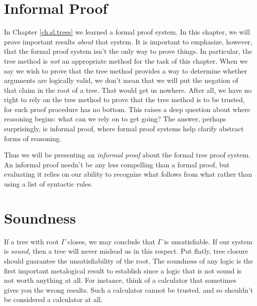 \section{Informal Proof}

In Chapter \ref{ch.sl.trees} we learned a formal proof system.
In this chapter, we will prove important results \emph{about} that system.
It is important to emphasize, however, that the formal proof system isn't the only way to prove things.
In particular, the tree method is \emph{not} an appropriate method for the task of this chapter.
When we say we wish to prove that the tree method provides a way to determine whether arguments are logically valid, we don't mean that we will put the negation of that claim in the root of a tree.
That would get us nowhere.
After all, we have no right to rely on the tree method to prove that the tree method is to be trusted, for such proof procedure has no bottom.
This raises a deep question about where reasoning begins: what can we rely on to get going?
The answer, perhaps surprisingly, is informal proof, where formal proof systems help clarify abstract forms of reasoning.

Thus we will be presenting an \emph{informal proof} about the formal tree proof system.
An informal proof needn't be any less compelling than a formal proof, but evaluating it relies on our ability to recognize what follows from what rather than using a list of syntactic rules.





\section{Soundness}

If a tree with root $\Gamma$ closes, we may conclude that $\Gamma$ is unsatisfiable.
If our system is \textit{sound}, then a tree will never mislead us in this respect.
Put flatly, tree closure should guarantee the unsatisfiability of the root.
The soundness of any logic is the first important metalogical result to establish since a logic that is not sound is not worth anything at all.
For instance, think of a calculator that sometimes gives you the wrong results.
Such a calculator cannot be trusted, and so shouldn't be considered a calculator at all.

\label{definesound}

